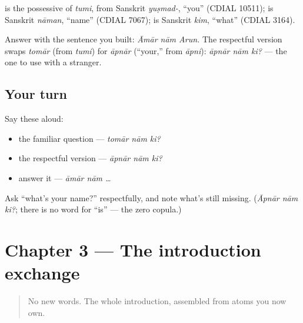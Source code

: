 \begin{cousinweb}
\textbf{} is the possessive of \emph{tumi}, from Sanskrit \emph{yuṣmad-}, \textquotedblleft{}you\textquotedblright{} (CDIAL 10511); \textbf{} is Sanskrit \emph{nāman}, \textquotedblleft{}name\textquotedblright{} (CDIAL 7067); \textbf{} is Sanskrit \emph{kim}, \textquotedblleft{}what\textquotedblright{} (CDIAL 3164).
\end{cousinweb}

\begin{grammarlens}[title={Grammar Lens: answering, and the respectful form}]
Answer with the sentence you built: \emph{Āmār nām Arun.} The respectful version swaps \emph{tomār} (from \emph{tumi}) for \emph{āpnār} (\textquotedblleft{}your,\textquotedblright{} from \emph{āpni}): \emph{āpnār nām ki?} — the one to use with a stranger.
\end{grammarlens}

\subsection*{Your turn}
Say these aloud:

\begin{itemize}
\raggedright
  \item the familiar question — \emph{tomār nām ki?}
  \item the respectful version — \emph{āpnār nām ki?}
  \item answer it — \emph{āmār nām …}
\end{itemize}

\begin{tcolorbox}[breakable,colback=teal!4,colframe=teal!35!black,title={Before you move on}]
Ask \textquotedblleft{}what's your name?\textquotedblright{} respectfully, and note what's still missing. (\emph{Āpnār nām ki?}; there is no word for \textquotedblleft{}is\textquotedblright{} — the zero copula.)
\end{tcolorbox}
\section[Practice]{Chapter 3 — The introduction exchange}

\label{lesson:BN-C02-practice}



\begin{quote}
No new words. The whole introduction, assembled from atoms you now own.
\end{quote}

